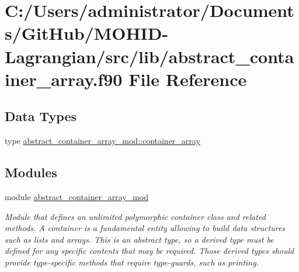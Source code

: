 \hypertarget{abstract__container__array_8f90}{}\section{C\+:/\+Users/administrator/\+Documents/\+Git\+Hub/\+M\+O\+H\+I\+D-\/\+Lagrangian/src/lib/abstract\+\_\+container\+\_\+array.f90 File Reference}
\label{abstract__container__array_8f90}
\subsection*{Data Types}
\begin{DoxyCompactItemize}
\item 
type \mbox{\hyperlink{structabstract__container__array__mod_1_1container__array}{abstract\+\_\+container\+\_\+array\+\_\+mod\+::container\+\_\+array}}
\end{DoxyCompactItemize}
\subsection*{Modules}
\begin{DoxyCompactItemize}
\item 
module \mbox{\hyperlink{namespaceabstract__container__array__mod}{abstract\+\_\+container\+\_\+array\+\_\+mod}}
\begin{DoxyCompactList}\small\item\em Module that defines an unlimited polymorphic container class and related methods. A container is a fundamental entity allowing to build data structures such as lists and arrays. This is an abstract type, so a derived type must be defined for any specific contents that may be required. Those derived types should provide type-\/specific methods that require type-\/guards, such as printing. \end{DoxyCompactList}\end{DoxyCompactItemize}
